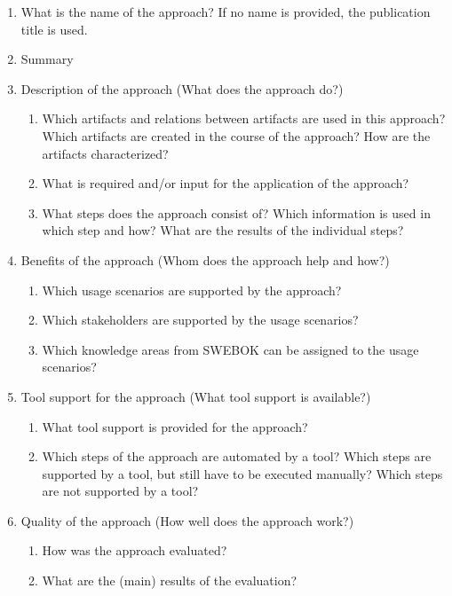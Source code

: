 \begin{enumerate}
	\item What is the name of the approach? If no name is provided, the publication title is used.
	\item Summary
	\item Description of the approach (What does the approach do?)
	\begin{enumerate}
		\item Which artifacts and relations between artifacts are used in this approach? Which artifacts are created in the course of the approach? How are the artifacts characterized?
		\item What is required and/or input for the application of the approach?
		\item What steps does the approach consist of? Which information is used in which step and how? What are the results of the individual steps?
	\end{enumerate}
	\item Benefits of the approach (Whom does the approach help and how?)
	\begin{enumerate}
		\item Which usage scenarios are supported by the approach?
		\item Which stakeholders are supported by the usage scenarios?
		\item Which knowledge areas from SWEBOK can be assigned to the usage scenarios?
	\end{enumerate}
	\item Tool support for the approach (What tool support is available?)
	\begin{enumerate}
		\item What tool support is provided for the approach?
		\item Which steps of the approach are automated by a tool? Which steps are supported by a tool, but still have to be executed manually? Which steps are not supported by a tool?
	\end{enumerate}
	\item Quality of the approach (How well does the approach work?)
	\begin{enumerate}
		\item How was the approach evaluated?
		\item What are the (main) results of the evaluation?
	\end{enumerate}
\end{enumerate}

